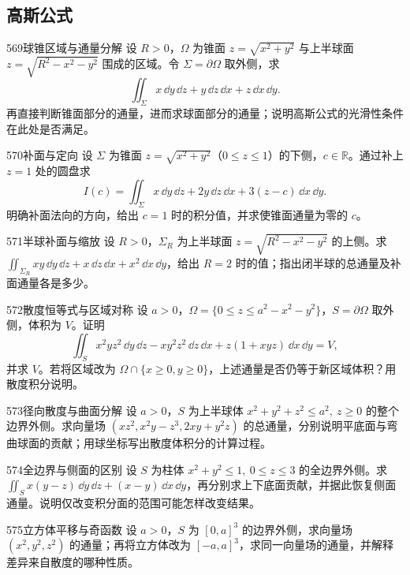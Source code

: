 \subsection{高斯公式}
\begin{exercise}{569}{球锥区域与通量分解}
设 $R>0$，$\Omega$ 为锥面 $z=\sqrt{x^2+y^2}$ 与上半球面 $z=\sqrt{R^2-x^2-y^2}$ 围成的区域。令 $\Sigma=\partial\Omega$ 取外侧，求
\[\iint_{\Sigma}x\,\dd y\,\dd z+y\,\dd z\,\dd x+z\,\dd x\,\dd y.\]
再直接判断锥面部分的通量，进而求球面部分的通量；说明高斯公式的光滑性条件在此处是否满足。
\end{exercise}
\begin{exercise}{570}{补面与定向}
设 $\Sigma$ 为锥面 $z=\sqrt{x^2+y^2}$（$0\le z\le1$）的下侧，$c\in\mathbb R$。通过补上 $z=1$ 处的圆盘求
\[I(c)=\iint_{\Sigma}x\,\dd y\,\dd z+2y\,\dd z\,\dd x+3(z-c)\,\dd x\,\dd y.\]
明确补面法向的方向，给出 $c=1$ 时的积分值，并求使锥面通量为零的 $c$。
\end{exercise}
\begin{exercise}{571}{半球补面与缩放}
设 $R>0$，$\Sigma_R$ 为上半球面 $z=\sqrt{R^2-x^2-y^2}$ 的上侧。求 $\iint_{\Sigma_R}xy\,\dd y\,\dd z+x\,\dd z\,\dd x+x^2\,\dd x\,\dd y$，给出 $R=2$ 时的值；指出闭半球的总通量及补面通量各是多少。
\end{exercise}
\begin{exercise}{572}{散度恒等式与区域对称}
设 $a>0$，$\Omega=\{0\le z\le a^2-x^2-y^2\}$，$S=\partial\Omega$ 取外侧，体积为 $V$。证明
\[\iint_Sx^2yz^2\,\dd y\,\dd z-xy^2z^2\,\dd z\,\dd x+z(1+xyz)\,\dd x\,\dd y=V,\]
并求 $V$。若将区域改为 $\Omega\cap\{x\ge0,y\ge0\}$，上述通量是否仍等于新区域体积？用散度积分说明。
\end{exercise}
\begin{exercise}{573}{径向散度与曲面分解}
设 $a>0$，$S$ 为上半球体 $x^2+y^2+z^2\le a^2,\ z\ge0$ 的整个边界外侧。求向量场 $(xz^2,x^2y-z^3,2xy+y^2z)$ 的总通量，分别说明平底面与弯曲球面的贡献；用球坐标写出散度体积分的计算过程。
\end{exercise}
\begin{exercise}{574}{全边界与侧面的区别}
设 $S$ 为柱体 $x^2+y^2\le1,\ 0\le z\le3$ 的全边界外侧。求 $\iint_Sx(y-z)\,\dd y\,\dd z+(x-y)\,\dd x\,\dd y$，再分别求上下底面贡献，并据此恢复侧面通量。说明仅改变积分面的范围可能怎样改变结果。
\end{exercise}
\begin{exercise}{575}{立方体平移与奇函数}
设 $a>0$，$S$ 为 $[0,a]^3$ 的边界外侧，求向量场 $(x^2,y^2,z^2)$ 的通量；再将立方体改为 $[-a,a]^3$，求同一向量场的通量，并解释差异来自散度的哪种性质。
\end{exercise}
